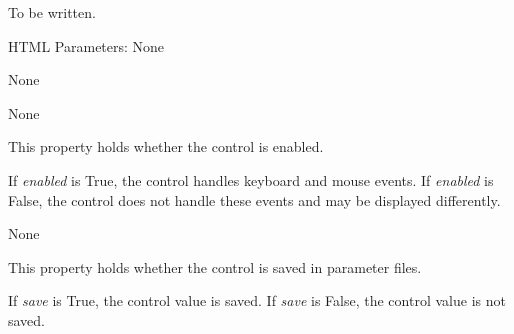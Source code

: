 \documentclass[letterpaper,10pt,english]{sphinxmanual}
\begin{document}
\begin{fulllineitems}
\label{api:qwt.Plot}
To be written.

HTML Parameters: None

\begin{fulllineitems}
\label{api:qwt.Plot.clear}
None

\end{fulllineitems}


\begin{fulllineitems}
\label{api:qwt.Plot.delete_element}
None

\end{fulllineitems}


\begin{fulllineitems}
\label{api:qwt.Plot.enabled}
This property holds whether the control is enabled.

If \emph{enabled} is True, the control handles keyboard and mouse events.
If \emph{enabled} is False, the control does not handle these events and may
be displayed differently.

\end{fulllineitems}


\begin{fulllineitems}
\label{api:qwt.Plot.new_element}
None

\end{fulllineitems}


\begin{fulllineitems}
\label{api:qwt.Plot.save}
This property holds whether the control is saved in parameter files.

If \emph{save} is True, the control value is saved.
If \emph{save} is False, the control value is not saved.

\end{fulllineitems}


\end{fulllineitems}
\end{document}
